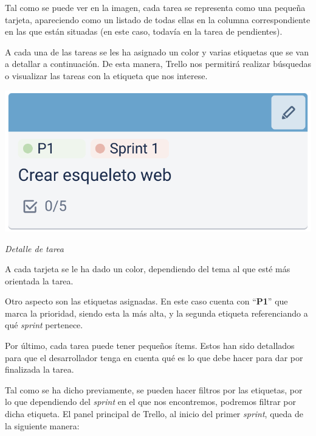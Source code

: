 \documentclass{\ClassPath/viu-tfm-template}
\begin{document}
\vspace{10pt}
Tal como se puede ver en la imagen, cada tarea se representa como una pequeña tarjeta, apareciendo como un listado de todas ellas en la columna correspondiente en las que están situadas (en este caso, todavía en la tarea de pendientes).

A cada una de las tareas se les ha asignado un color y varias etiquetas que se van a detallar a continuación. De esta manera, Trello nos permitirá realizar búsquedas o visualizar las tareas con la etiqueta que nos interese.


\begin{minipage}{0.48\linewidth}
    \includegraphics[width=\linewidth]{img/tarea.png}
    \vspace{-35pt}
    \begin{center}
        {\scriptsize \textit{Detalle de tarea}}
    \end{center}
\end{minipage}
\hfill
\begin{minipage}{0.47\linewidth}
    A cada tarjeta se le ha dado un color, dependiendo del tema al que esté más orientada la tarea.

    Otro aspecto son las etiquetas asignadas. En este caso cuenta con “\textbf{P1}” que marca la prioridad, siendo esta la más alta, y la segunda etiqueta referenciando a qué \textit{sprint} pertenece.
\end{minipage}

Por último, cada tarea puede tener pequeños ítems. Estos han sido detallados para que el desarrollador tenga en cuenta qué es lo que debe hacer para dar por finalizada la tarea.

Tal como se ha dicho previamente, se pueden hacer filtros por las etiquetas, por lo que dependiendo del \textit{sprint} en el que nos encontremos, podremos filtrar por dicha etiqueta. El panel principal de Trello, al inicio del primer \textit{sprint}, queda de la siguiente manera:
\end{document}
